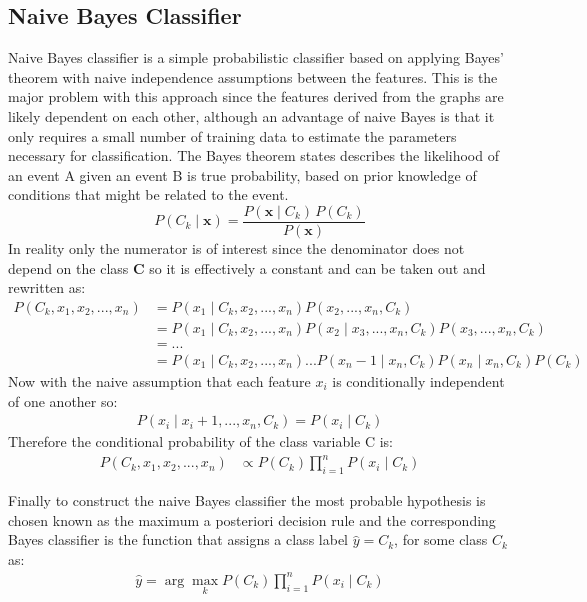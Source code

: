\documentclass[withindex,glossary]{cam-thesis}
\newcommand{\argmax}{\arg\!\max}
\begin{document}
\subsection{Naive Bayes Classifier}
Naive Bayes classifier is a simple probabilistic classifier based on applying Bayes' theorem with naive independence assumptions between the features. This is the major problem with this approach since the features derived from the graphs are likely  dependent on each other, although an advantage of naive Bayes is that it only requires a small number of training data to estimate the parameters necessary for classification.
The Bayes theorem states describes the likelihood of an event A given an event B is true probability, based on prior knowledge of conditions that might be related to the event. 
$$ P(C_k \mid \mathbf{x}) = \frac{P(\mathbf{x} \mid C_k) \, P(C_k)}{P(\mathbf{x})} $$
In reality only the numerator is of interest since the denominator does not depend on the class $\mathbf{C}$ so it is effectively a constant and can be taken out and rewritten as: 
\begin{equation}
\begin{split}
{P(C_k, x_1, x_2, ..., x_n)} & = P(x_1 \mid C_k, x_2, ..., x_n)P(x_2, ... , x_n, C_k) \\
							  & = P(x_1 \mid C_k, x_2, ..., x_n)P(x_2 \mid x_3, ... , x_n, C_k)P(x_3, ... , x_n, C_k) \\
                              & = ...\\
                              & = P(x_1 \mid C_k, x_2, ..., x_n)...P(x_n-1 \mid x_n, C_k)P(x_n \mid x_n, C_k)P(C_k)
\end{split}
\end{equation}
Now with the naive assumption that each feature ${x_i}$ is conditionally independent of one another so:
\begin{equation}
\begin{split}
P(x_i \mid x_i+1, ..., x_n, C_k) = P(x_i \mid C_k)
\end{split}
\end{equation}
Therefore the conditional probability of the class variable C is:
\begin{equation}
\begin{split}
{P(C_k, x_1, x_2, ..., x_n)} & \propto P(C_k){\displaystyle \prod_{i=1}^{n} P(x_i \mid C_k)}
\end{split}
\end{equation}

Finally to construct the naive Bayes classifier the most probable hypothesis is chosen known as the maximum a posteriori decision rule and the corresponding Bayes classifier is the function that assigns a class label $\hat y = C_k$, for some class $C_k$ as:
\begin{equation}
\begin{split}
\hat y = \argmax_k  P(C_k){\displaystyle \prod_{i=1}^{n} P(x_i \mid C_k)}
\end{split}
\end{equation}
\end{document}
